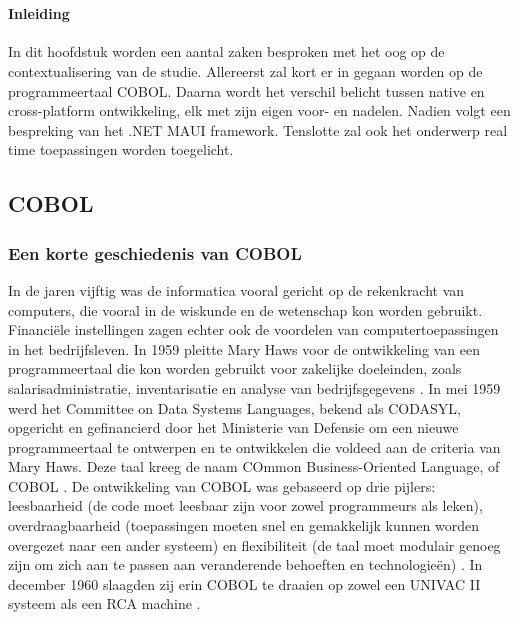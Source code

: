 \chapter{}%
\label{ch:stand-van-zaken}



\subsubsection{Inleiding}

In dit hoofdstuk worden een aantal zaken besproken met het oog op de contextualisering van de studie. Allereerst zal kort er in gegaan worden op de programmeertaal COBOL. Daarna wordt het verschil belicht tussen native en cross-platform ontwikkeling, elk met zijn eigen voor- en nadelen. Nadien volgt een bespreking van het .NET MAUI framework. Tenslotte zal ook het onderwerp real time toepassingen worden toegelicht.

\section{COBOL}
\subsection{Een korte geschiedenis van COBOL}
In de jaren vijftig was de informatica vooral gericht op de rekenkracht van computers, die vooral in de wiskunde en de wetenschap kon worden gebruikt. Financiële instellingen zagen echter ook de voordelen van computertoepassingen in het bedrijfsleven. In 1959 pleitte Mary Haws voor de ontwikkeling van een programmeertaal die kon worden gebruikt voor zakelijke doeleinden, zoals salarisadministratie, inventarisatie en analyse van bedrijfsgegevens \autocite{NMAH2013}.
In mei 1959 werd het Committee on Data Systems Languages, bekend als CODASYL, opgericht en gefinancierd door het Ministerie van Defensie om een nieuwe programmeertaal te ontwerpen en te ontwikkelen die voldeed aan de criteria van Mary Haws. Deze taal kreeg de naam COmmon Business-Oriented Language, of COBOL \autocite{Abby2023}.
De ontwikkeling van COBOL was gebaseerd op drie pijlers: leesbaarheid (de code moet leesbaar zijn voor zowel programmeurs als leken), overdraagbaarheid (toepassingen moeten snel en gemakkelijk kunnen worden overgezet naar een ander systeem) en flexibiliteit (de taal moet modulair genoeg zijn om zich aan te passen aan veranderende behoeften en technologieën) \autocite{Abby2023}.
In december 1960 slaagden zij erin COBOL te draaien op zowel een UNIVAC II systeem als een RCA machine \autocite{NMAH2013}.

